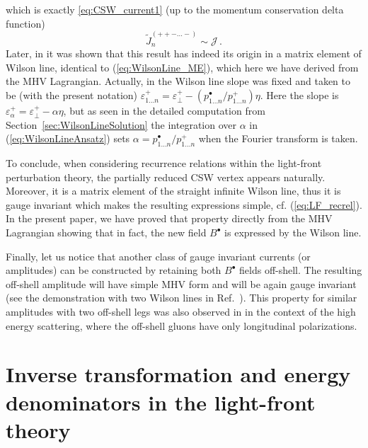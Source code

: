 \documentclass[english,american]{article}
\begin{document}
which is exactly \eqref{eq:CSW_current1} (up to the momentum conservation
delta function)
\begin{equation}
\tilde{J}_{n}^{\left(++-\dots-\right)}\sim\mathcal{J}\,.
\end{equation}
 Later, in \citep{Cruz-Santiago2015,Kotko2016} it was shown that
this result has indeed its origin in a matrix element of Wilson line,
identical to (\ref{eq:WilsonLine_ME}), which here we have derived
from the MHV Lagrangian. Actually, in \citep{Cruz-Santiago2015,Kotko2016}
the Wilson line slope was fixed and taken to be (with the present
notation) $\varepsilon_{1\dots n}^{+}=\varepsilon_{\perp}^{+}-(p_{1\dots n}^{\bullet}/p_{1\dots n}^{+})\eta$.
Here the slope is $\varepsilon_{\alpha}^{+}=\varepsilon_{\perp}^{+}-\alpha\eta$,
but as seen in the detailed computation from Section~\ref{sec:WilsonLineSolution}
the integration over $\alpha$ in (\ref{eq:WilsonLineAnsatz}) sets
$\alpha=p_{1\dots n}^{\bullet}/p_{1\dots n}^{+}$ when the Fourier
transform is taken.

To conclude, when considering recurrence relations within the light-front
perturbation theory, the partially reduced CSW vertex appears naturally.
Moreover, it is a matrix element of the straight infinite Wilson line,
thus it is gauge invariant which makes the resulting expressions simple,
cf. (\ref{eq:LF_recrel}). In the present paper, we have proved that
property directly from the MHV Lagrangian showing that in fact, the new
field $B^{\bullet}$ is expressed by the Wilson line.

Finally, let us notice that another class of gauge invariant currents
(or amplitudes) can be constructed by retaining both $B^{\bullet}$
fields off-shell. The resulting off-shell amplitude will have simple
MHV form and will be again gauge invariant (see the demonstration
with two Wilson lines in Ref.~\citep{Kotko2014a}). This property
for similar amplitudes with two off-shell legs was also observed in
\citep{vanHameren:2014iua} in the context of the high energy scattering, where the off-shell gluons have only longitudinal polarizations.


\section{Inverse transformation and energy denominators in the light-front theory}

\label{sec:Diagramma}
\end{document}
